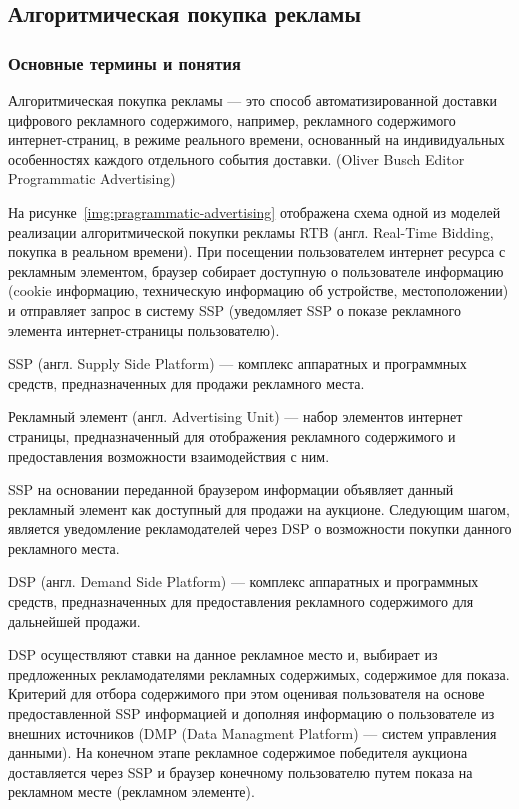 \subsection{Алгоритмическая покупка рекламы}
\subsubsection{Основные термины и понятия}

Алгоритмическая покупка рекламы --- это способ автоматизированной доставки цифрового рекламного содержимого,
например, рекламного содержимого интернет-страниц, в режиме реального времени, основанный на индивидуальных 
особенностях каждого отдельного события доставки. (Oliver Busch Editor Programmatic Advertising)


На рисунке~\ref{img:pragrammatic-advertising} отображена схема одной из моделей реализации 
алгоритмической покупки рекламы RTB (англ. Real-Time Bidding, покупка в реальном времени). При посещении пользователем интернет ресурса 
с рекламным элементом, браузер собирает доступную о пользователе информацию 
(cookie информацию, техническую информацию об устройстве, местоположении) и отправляет запрос в систему SSP 
(уведомляет SSP о показе рекламного элемента интернет-страницы пользователю).

SSP (англ. Supply Side Platform) --- комплекс аппаратных и программных средств, предназначенных для продажи 
рекламного места.

Рекламный элемент (англ. Advertising Unit) --- набор элементов интернет страницы, предназначенный для 
отображения рекламного содержимого и предоставления возможности взаимодействия с ним.

SSP на основании переданной браузером информации объявляет данный рекламный элемент как доступный для 
продажи на аукционе. Следующим шагом, является уведомление рекламодателей через DSP о возможности покупки
данного рекламного места.

DSP (англ. Demand Side Platform) --- комплекс аппаратных и программных средств, предназначенных для предоставления
рекламного содержимого для дальнейшей продажи.

DSP осуществляют ставки на данное рекламное место и, выбирает из предложенных рекламодателями рекламных содержимых,
содержимое для показа. Критерий для отбора содержимого  при этом оценивая пользователя на основе предоставленной
SSP информацией и дополняя информацию о пользователе из внешних источников (DMP (Data Managment Platform) --- 
систем управления данными). На конечном этапе рекламное содержимое победителя аукциона доставляется через SSP и
браузер конечному пользователю путем показа на рекламном месте (рекламном элементе).

